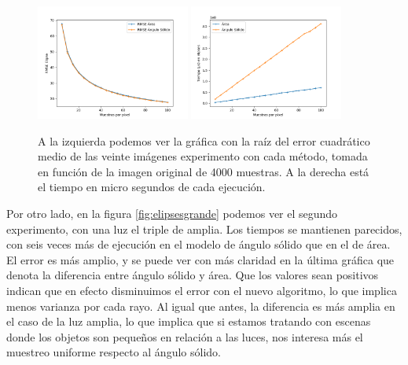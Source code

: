 \documentclass{scrbook}
\begin{document}
\begin{figure}[ht]
	\centering
	\includegraphics[width=0.45\textwidth]{rmse_elipse}
	\includegraphics[width=0.45\textwidth]{tiempo_elipse}
	
	\caption{A la izquierda podemos ver la gráfica con la raíz del error cuadrático medio de las veinte imágenes experimento con cada método, tomada en función de la imagen original de 4000 muestras. A la derecha está el tiempo en micro segundos de cada ejecución.}
	\label{fig:elipsesgraficas}
\end{figure}

Por otro lado, en la figura \ref{fig:elipsesgrande} podemos ver el segundo experimento, con una luz el triple de amplia. Los tiempos se mantienen parecidos, con seis veces más de ejecución en el modelo de ángulo sólido que en el de área. El error es más amplio, y se puede ver con más claridad en la última gráfica que denota la diferencia entre ángulo sólido y área. Que los valores sean positivos indican que en efecto disminuimos el error con el nuevo algoritmo, lo que implica menos varianza por cada rayo. Al igual que antes, la diferencia es más amplia en el caso de la luz amplia, lo que implica que si estamos tratando con escenas donde los objetos son pequeños en relación a las luces, nos interesa más el muestreo uniforme respecto al ángulo sólido. 
\end{document}
